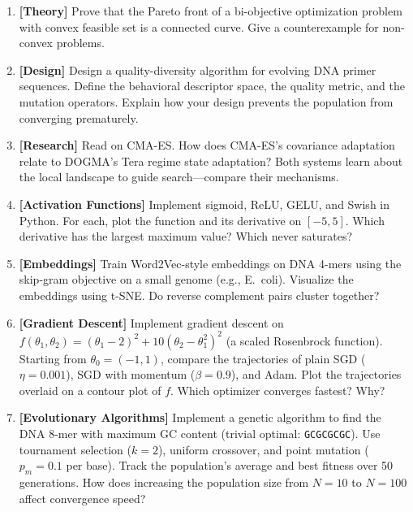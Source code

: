 \begin{enumerate}[label=\textbf{4.\arabic*.}, leftmargin=2.5em]
\item \textbf{[Theory]} Prove that the Pareto front of a bi-objective optimization problem with convex feasible set is a connected curve. Give a counterexample for non-convex problems.

\item \textbf{[Design]} Design a quality-diversity algorithm for evolving DNA primer sequences. Define the behavioral descriptor space, the quality metric, and the mutation operators. Explain how your design prevents the population from converging prematurely.

\item \textbf{[Research]} Read \citet{hansen2001} on CMA-ES. How does CMA-ES's covariance adaptation relate to DOGMA's Tera regime state adaptation? Both systems learn about the local landscape to guide search---compare their mechanisms.

\item \textbf{[Activation Functions]} Implement sigmoid, ReLU, GELU, and Swish in Python. For each, plot the function and its derivative on $[-5, 5]$. Which derivative has the largest maximum value? Which never saturates?

\item \textbf{[Embeddings]} Train Word2Vec-style embeddings on DNA 4-mers using the skip-gram objective on a small genome (e.g., E.\ coli). Visualize the embeddings using t-SNE. Do reverse complement pairs cluster together?

\item \textbf{[Gradient Descent]} Implement gradient descent on $f(\theta_1, \theta_2) = (\theta_1 - 2)^2 + 10(\theta_2 - \theta_1^2)^2$ (a scaled Rosenbrock function). Starting from $\theta_0 = (-1, 1)$, compare the trajectories of plain SGD ($\eta = 0.001$), SGD with momentum ($\beta = 0.9$), and Adam. Plot the trajectories overlaid on a contour plot of $f$. Which optimizer converges fastest? Why?

\item \textbf{[Evolutionary Algorithms]} Implement a genetic algorithm to find the DNA 8-mer with maximum GC content (trivial optimal: \texttt{GCGCGCGC}). Use tournament selection ($k=2$), uniform crossover, and point mutation ($p_m = 0.1$ per base). Track the population's average and best fitness over 50 generations. How does increasing the population size from $N=10$ to $N=100$ affect convergence speed?

\end{enumerate}

